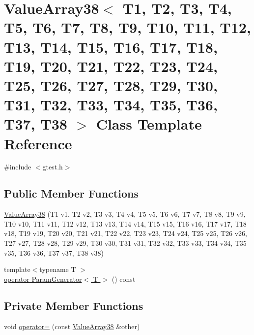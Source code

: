 \hypertarget{classtesting_1_1internal_1_1ValueArray38}{\section{\-Value\-Array38$<$ \-T1, \-T2, \-T3, \-T4, \-T5, \-T6, \-T7, \-T8, \-T9, \-T10, \-T11, \-T12, \-T13, \-T14, \-T15, \-T16, \-T17, \-T18, \-T19, \-T20, \-T21, \-T22, \-T23, \-T24, \-T25, \-T26, \-T27, \-T28, \-T29, \-T30, \-T31, \-T32, \-T33, \-T34, \-T35, \-T36, \-T37, \-T38 $>$ \-Class \-Template \-Reference}
\label{d5/d7a/classtesting_1_1internal_1_1ValueArray38}
}


{\ttfamily \#include $<$gtest.\-h$>$}

\subsection*{\-Public \-Member \-Functions}
\begin{DoxyCompactItemize}
\item 
\hyperlink{classtesting_1_1internal_1_1ValueArray38_afbe44bc8f31992c51d06955db18aa33d}{\-Value\-Array38} (\-T1 v1, \-T2 v2, \-T3 v3, \-T4 v4, \-T5 v5, \-T6 v6, \-T7 v7, \-T8 v8, \-T9 v9, \-T10 v10, \-T11 v11, \-T12 v12, \-T13 v13, \-T14 v14, \-T15 v15, \-T16 v16, \-T17 v17, \-T18 v18, \-T19 v19, \-T20 v20, \-T21 v21, \-T22 v22, \-T23 v23, \-T24 v24, \-T25 v25, \-T26 v26, \-T27 v27, \-T28 v28, \-T29 v29, \-T30 v30, \-T31 v31, \-T32 v32, \-T33 v33, \-T34 v34, \-T35 v35, \-T36 v36, \-T37 v37, \-T38 v38)
\item 
{\footnotesize template$<$typename T $>$ }\\\hyperlink{classtesting_1_1internal_1_1ValueArray38_a08ef46fa12c9dd8ef6fc630baeea89b7}{operator Param\-Generator$<$ T $>$} () const 
\end{DoxyCompactItemize}
\subsection*{\-Private \-Member \-Functions}
\begin{DoxyCompactItemize}
\item 
void \hyperlink{classtesting_1_1internal_1_1ValueArray38_a5a0deaa6fae4e7227e267bcaa7f4cffa}{operator=} (const \hyperlink{classtesting_1_1internal_1_1ValueArray38}{\-Value\-Array38} \&other)
\end{DoxyCompactItemize}
